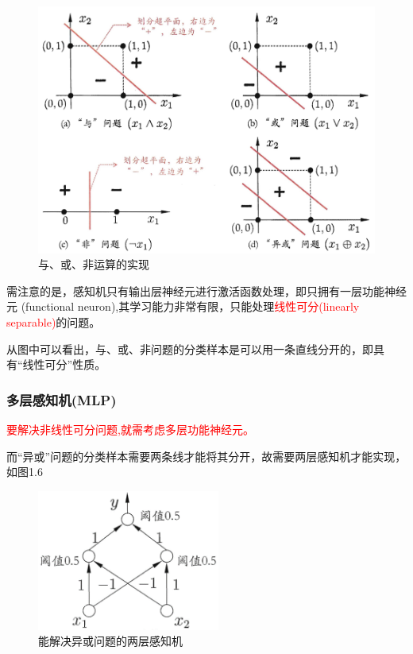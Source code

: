 \begin{figure}[h]
\small
\centering
\includegraphics[width=14cm]{figure//5.png}
\caption{与、或、非运算的实现} \label{fig:5}
\end{figure}

需注意的是，感知机只有输出层神经元进行激活函数处理，即只拥有一层功能神经元 (functional neuron),其学习能力非常有限，只能处理\textcolor{red}{线性可分(linearly separable)}的问题。

从图中可以看出，与、或、非问题的分类样本是可以用一条直线分开的，即具有“线性可分”性质。

\subsubsection{多层感知机(MLP)}
\textcolor{red}{要解决非线性可分问题,就需考虑多层功能神经元。}

而“异或”问题的分类样本需要两条线才能将其分开，故需要两层感知机才能实现，如图1.6

\begin{figure}[h]
\small
\centering
\includegraphics[width=6cm]{figure//6.png}
\caption{能解决异或问题的两层感知机} \label{fig:6}
\end{figure}

